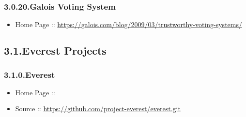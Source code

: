 \documentclass[12pt,twoside]{article}
\begin{document}
\subsubsection{3.0.20.\hspace*{0.5em}Galois Voting System}\label{sec-galois-voting-system}%

\begin{itemize}[noitemsep,topsep=\mdcompacttopsep]%

\item{}Home Page :: \href{https://galois.com/blog/2009/03/trustworthy-voting-systems/}{{\ttfamily https://\hspace{0pt}galois.\hspace{0pt}com/\hspace{0pt}blog/\hspace{0pt}2009/\hspace{0pt}03/\hspace{0pt}trustworthy-\hspace{0pt}voting-\hspace{0pt}systems/\hspace{0pt}}}%
\end{itemize}%

\subsection{3.1.\hspace*{0.5em}Everest Projects}\label{sec-everest-projects}%

\subsubsection{3.1.0.\hspace*{0.5em}Everest}\label{sec-everest}%

\begin{itemize}[noitemsep,topsep=\mdcompacttopsep]%

\item{}Home Page ::%

\item{}Source :: \href{https://github.com/project-everest/everest.git}{{\ttfamily https://\hspace{0pt}github.\hspace{0pt}com/\hspace{0pt}project-\hspace{0pt}everest/\hspace{0pt}everest.\hspace{0pt}git}}%
\end{itemize}%
\end{document}
